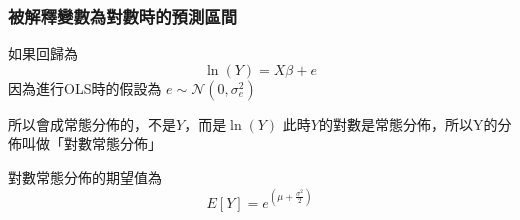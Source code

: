 \begin{frame}
    \frametitle{被解釋變數為對數時的預測區間}
    如果回歸為
    \begin{equation*}
        \ln(Y) = X\beta + e
    \end{equation*}
    因為進行OLS時的假設為 $e\sim \mathcal{N}(0, \sigma_e^2)$

    所以會成常態分佈的，不是$Y$，而是$\ln(Y)$
    \vfill
    此時$Y$的對數是常態分佈，所以Y的分佈叫做「對數常態分佈」

    對數常態分佈的期望值為
    \begin{equation*}
        E[Y] = e^{(\mu + \frac{\sigma^2}{2})}
    \end{equation*}

\end{frame}